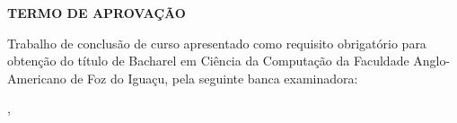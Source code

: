 \begin{folhadeaprovacao}
\begin{center}
	\vspace*{1cm}  
  	\large\textbf{TERMO DE APROVAÇÃO}
  	
  	\vspace*{1cm}
  	{\large\textbf\imprimirautor}

   \vspace*{1cm}
    {\large\textbf\imprimirtitulo}   
 \end{center}     
  
	
	\hspace{.4\textwidth}
	\SingleSpace\noindent\normalsize{Trabalho de conclusão de curso apresentado como requisito obrigatório para obtenção do título de Bacharel em Ciência da Computação da Faculdade Anglo-Americano de Foz do Iguaçu, pela seguinte banca examinadora:}
   
    
   \vspace*{0.5cm}  %
   \vspace*{2.5cm}
   \begin{center}
   	{\imprimirlocal, \ \imprimirdata}
   \end{center}
   
 
\end{folhadeaprovacao}